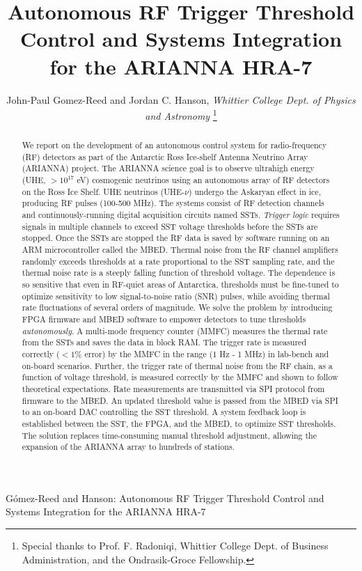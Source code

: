 \documentclass[journal]{IEEEtran}
\begin{document}
\title{Autonomous RF Trigger Threshold Control and Systems Integration for the ARIANNA HRA-7}

\author{John-Paul Gomez-Reed and Jordan C. Hanson, \textit{Whittier College Dept. of Physics and Astronomy}
\thanks{Special thanks to Prof. F. Radoniqi, Whittier College Dept. of Business Administration, and the Ondrasik-Groce Fellowship.}}

{G\'{o}mez-Reed and Hanson: Autonomous RF Trigger Threshold Control and Systems Integration for the ARIANNA HRA-7}

\maketitle

\begin{abstract}
We report on the development of an autonomous control system for radio-frequency (RF) detectors as part of the Antarctic Ross Ice-shelf Antenna Neutrino Array (ARIANNA) project.  The ARIANNA science goal is to observe ultrahigh energy (UHE, $>10^{17}$ eV) cosmogenic neutrinos using an autonomous array of RF detectors on the Ross Ice Shelf.  UHE neutrinos (UHE-$\nu$) undergo the Askaryan effect in ice, producing RF pulses (100-500 MHz).  The systems consist of RF detection channels and continuously-running digital acquisition circuits named SSTs.  \textit{Trigger logic} requires signals in multiple channels to exceed SST voltage thresholds before the SSTs are stopped.  Once the SSTs are stopped the RF data is saved by software running on an ARM microcontroller called the MBED. Thermal noise from the RF channel amplifiers randomly exceeds thresholds at a rate proportional to the SST sampling rate, and the thermal noise rate is a steeply falling function of threshold voltage.  The dependence is so sensitive that even in RF-quiet areas of Antarctica, thresholds must be fine-tuned to optimize sensitivity to low signal-to-noise ratio (SNR) pulses, while avoiding thermal rate fluctuations of several orders of magnitude.  We solve the problem by introducing FPGA firmware and MBED software to empower detectors to tune thresholds \textit{autonomously}.  A multi-mode frequency counter (MMFC) measures the thermal rate from the SSTs and saves the data in block RAM.  The trigger rate is measured correctly ($<1\%$ error) by the MMFC in the range (1 Hz - 1 MHz) in lab-bench and on-board scenarios.  Further, the trigger rate of thermal noise from the RF chain, as a function of voltage threshold, is measured correctly by the MMFC and shown to follow theoretical expectations.  Rate measurements are transmitted via SPI protocol from firmware to the MBED.  An updated threshold value is passed from the MBED via SPI to an on-board DAC controlling the SST threshold.  A system feedback loop is established between the SST, the FPGA, and the MBED, to optimize SST thresholds.  The solution replaces time-consuming manual threshold adjustment, allowing the expansion of the ARIANNA array to hundreds of stations.
\end{abstract}
\IEEEpeerreviewmaketitle
\end{document}
